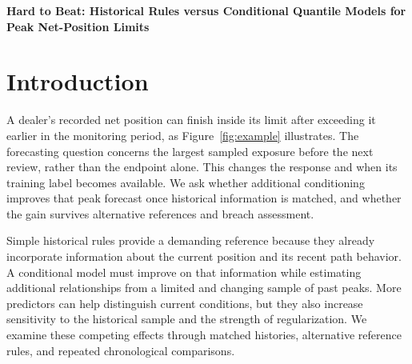 \documentclass[11pt,a4paper]{article}
\begin{document}
\begin{center}\Large\bfseries Hard to Beat: Historical Rules versus Conditional Quantile Models for Peak Net-Position Limits\end{center}

\begin{abstract}Risk limits on dealer positions concern the largest magnitude reached before a review horizon ends, rather than the position at its endpoint. We compare historical and conditional quantile forecasts of sampled absolute-position peaks for an FX market maker and weekly primary-dealer position aggregates. Simple historical rules prove difficult to beat. At the shorter horizon, long-history FX regression lowers matched loss by 14.8\% and 16.6\% in the previously reported later and earlier windows. Its later advantage survives a delayed adaptive coverage adjustment (ACI). Before correction, however, regression breaches more frequently, while its ranking against a shorter-history rolling rule changes across periods. After stronger regularization, regression still loses 34 of 48 additional-panel comparisons. We formalize the known-floor target and apply a classical endpoint-to-peak bound under explicit assumptions. The results support joint validation of accuracy, breach behavior, and stability across reference rules, periods, and related series. A controlled simulation rejects a universal narrow-regime explanation, while aggregation and the overlapping backcast further qualify the empirical pattern.\end{abstract}

\section{Introduction}\label{sec:intro}

A dealer's recorded net position can finish inside its limit after exceeding it earlier in the monitoring period, as Figure~\ref{fig:example} illustrates. The forecasting question concerns the largest sampled exposure before the next review, rather than the endpoint alone. This changes the response and when its training label becomes available. We ask whether additional conditioning improves that peak forecast once historical information is matched, and whether the gain survives alternative references and breach assessment.


Simple historical rules provide a demanding reference because they already incorporate information about the current position and its recent path behavior. A conditional model must improve on that information while estimating additional relationships from a limited and changing sample of past peaks. More predictors can help distinguish current conditions, but they also increase sensitivity to the historical sample and the strength of regularization. We examine these competing effects through matched histories, alternative reference rules, and repeated chronological comparisons.
\end{document}
